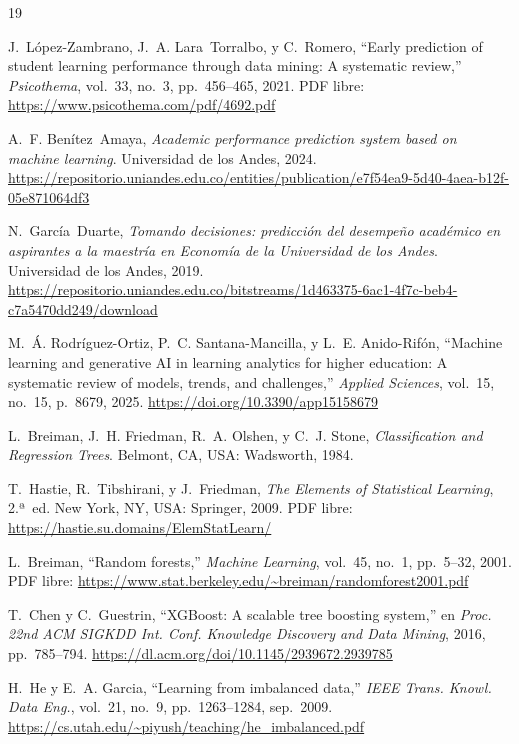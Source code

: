 \documentclass[12pt, letterpaper, openany]{report}
\begin{document}
\begin{thebibliography}{19}

J.~López-Zambrano, J.~A. Lara~Torralbo, y C.~Romero,
``Early prediction of student learning performance through data
mining: A systematic review,''
\textit{Psicothema}, vol.~33, no.~3, pp.~456--465, 2021.
PDF libre: \url{https://www.psicothema.com/pdf/4692.pdf}

A.~F. Benítez~Amaya,
\textit{Academic performance prediction system based on machine learning}.
Universidad de los Andes, 2024.
\url{https://repositorio.uniandes.edu.co/entities/publication/e7f54ea9-5d40-4aea-b12f-05e871064df3}

N.~García~Duarte,
\textit{Tomando decisiones: predicción del desempeño académico en
aspirantes a la maestría en Economía de la Universidad de los Andes}.
Universidad de los Andes, 2019.
\url{https://repositorio.uniandes.edu.co/bitstreams/1d463375-6ac1-4f7c-beb4-c7a5470dd249/download}

M.~Á. Rodríguez-Ortiz, P.~C. Santana-Mancilla, y L.~E. Anido-Rifón,
``Machine learning and generative AI in learning analytics for
higher education: A systematic review of models, trends, and
challenges,''
\textit{Applied Sciences}, vol.~15, no.~15, p.~8679, 2025.
\url{https://doi.org/10.3390/app15158679}

L.~Breiman, J.~H. Friedman, R.~A. Olshen, y C.~J. Stone,
\textit{Classification and Regression Trees}.
Belmont, CA, USA: Wadsworth, 1984.

T.~Hastie, R.~Tibshirani, y J.~Friedman,
\textit{The Elements of Statistical Learning},
2.ª~ed. New York, NY, USA: Springer, 2009.
PDF libre: \url{https://hastie.su.domains/ElemStatLearn/}

L.~Breiman, ``Random forests,''
\textit{Machine Learning}, vol.~45, no.~1, pp.~5--32, 2001.
PDF libre: \url{https://www.stat.berkeley.edu/~breiman/randomforest2001.pdf}

T.~Chen y C.~Guestrin, ``XGBoost: A scalable tree boosting system,''
en \textit{Proc. 22nd ACM SIGKDD Int. Conf. Knowledge Discovery and
Data Mining}, 2016, pp.~785--794.
\url{https://dl.acm.org/doi/10.1145/2939672.2939785}

H.~He y E.~A. Garcia, ``Learning from imbalanced data,''
\textit{IEEE Trans. Knowl. Data Eng.}, vol.~21, no.~9,
pp.~1263--1284, sep.\ 2009.
\url{https://cs.utah.edu/~piyush/teaching/he_imbalanced.pdf}


\end{thebibliography}
\end{document}
